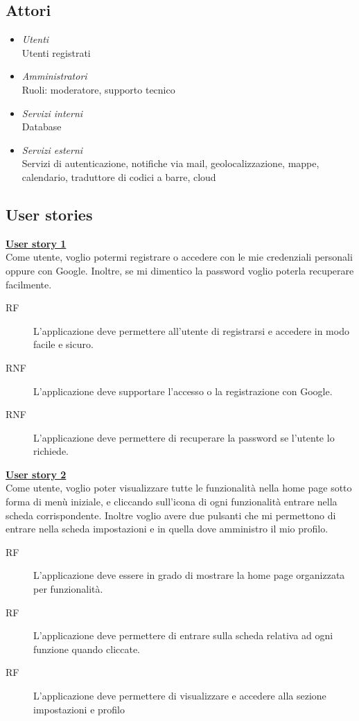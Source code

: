 \documentclass[a4paper,12pt]{article}
\begin{document}
\subsection*{Attori}
\begin{itemize}
 \setlength\itemsep{0.01em}
\item \textit{ Utenti}
\\ Utenti registrati
\item \textit{ Amministratori}
\\ Ruoli: moderatore, supporto tecnico
\item \textit{ Servizi interni}
\\ Database
\item \textit{ Servizi esterni}
\\ Servizi di autenticazione, notifiche via mail, geolocalizzazione, mappe, calendario, traduttore di codici a barre, cloud

\end{itemize}

\subsection*{User stories}
 \underline{\textbf{User story 1}} \\
Come utente, voglio potermi registrare o accedere con le mie credenziali personali oppure con Google. Inoltre, se mi dimentico la password voglio poterla recuperare facilmente.
\begin{description}
\item[RF] L'applicazione deve permettere all'utente di registrarsi e accedere in modo facile e sicuro.
\item[RNF] L'applicazione deve supportare l'accesso o la registrazione con Google.
\item[RNF] L'applicazione deve permettere di recuperare la password se l'utente lo richiede.
\end{description}

\underline{\textbf{User story 2}} \\
Come utente, voglio poter visualizzare tutte le funzionalità nella home page sotto forma di menù iniziale, e cliccando sull'icona di ogni funzionalità entrare nella scheda corrispondente. Inoltre voglio avere due pulsanti che mi permettono di entrare nella scheda impostazioni e in quella dove amministro il mio profilo.

\begin{description}
\item [RF] L'applicazione deve essere in grado di mostrare la home page organizzata per funzionalità.
\item [RF]L'applicazione deve permettere di entrare sulla scheda relativa ad ogni funzione quando cliccate.
\item[RF] L'applicazione deve permettere di visualizzare e accedere alla sezione impostazioni e profilo
\end{description}
\end{document}
